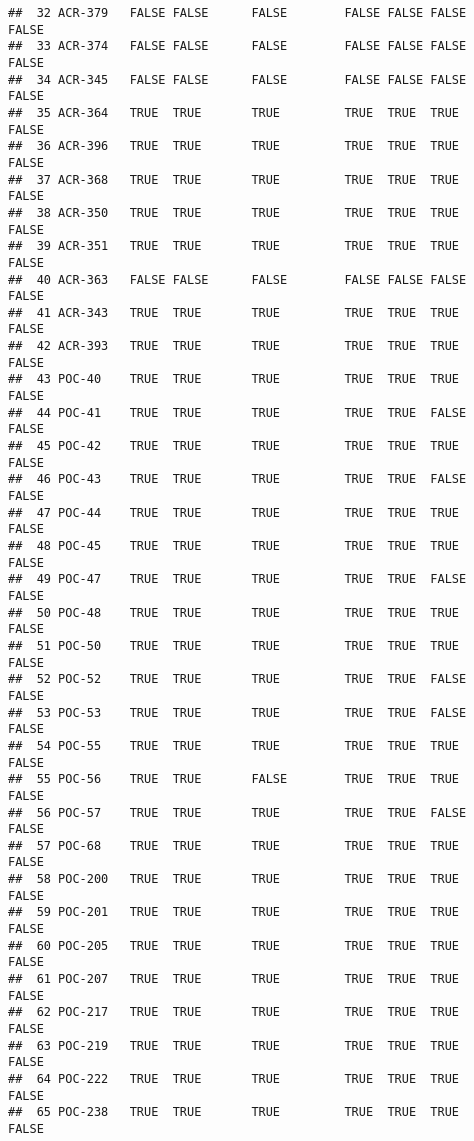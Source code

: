 \documentclass[]{article}
\begin{document}
\begin{verbatim}
##  32 ACR-379   FALSE FALSE      FALSE        FALSE FALSE FALSE   FALSE     
##  33 ACR-374   FALSE FALSE      FALSE        FALSE FALSE FALSE   FALSE     
##  34 ACR-345   FALSE FALSE      FALSE        FALSE FALSE FALSE   FALSE     
##  35 ACR-364   TRUE  TRUE       TRUE         TRUE  TRUE  TRUE    FALSE     
##  36 ACR-396   TRUE  TRUE       TRUE         TRUE  TRUE  TRUE    FALSE     
##  37 ACR-368   TRUE  TRUE       TRUE         TRUE  TRUE  TRUE    FALSE     
##  38 ACR-350   TRUE  TRUE       TRUE         TRUE  TRUE  TRUE    FALSE     
##  39 ACR-351   TRUE  TRUE       TRUE         TRUE  TRUE  TRUE    FALSE     
##  40 ACR-363   FALSE FALSE      FALSE        FALSE FALSE FALSE   FALSE     
##  41 ACR-343   TRUE  TRUE       TRUE         TRUE  TRUE  TRUE    FALSE     
##  42 ACR-393   TRUE  TRUE       TRUE         TRUE  TRUE  TRUE    FALSE     
##  43 POC-40    TRUE  TRUE       TRUE         TRUE  TRUE  TRUE    FALSE     
##  44 POC-41    TRUE  TRUE       TRUE         TRUE  TRUE  FALSE   FALSE     
##  45 POC-42    TRUE  TRUE       TRUE         TRUE  TRUE  TRUE    FALSE     
##  46 POC-43    TRUE  TRUE       TRUE         TRUE  TRUE  FALSE   FALSE     
##  47 POC-44    TRUE  TRUE       TRUE         TRUE  TRUE  TRUE    FALSE     
##  48 POC-45    TRUE  TRUE       TRUE         TRUE  TRUE  TRUE    FALSE     
##  49 POC-47    TRUE  TRUE       TRUE         TRUE  TRUE  FALSE   FALSE     
##  50 POC-48    TRUE  TRUE       TRUE         TRUE  TRUE  TRUE    FALSE     
##  51 POC-50    TRUE  TRUE       TRUE         TRUE  TRUE  TRUE    FALSE     
##  52 POC-52    TRUE  TRUE       TRUE         TRUE  TRUE  FALSE   FALSE     
##  53 POC-53    TRUE  TRUE       TRUE         TRUE  TRUE  FALSE   FALSE     
##  54 POC-55    TRUE  TRUE       TRUE         TRUE  TRUE  TRUE    FALSE     
##  55 POC-56    TRUE  TRUE       FALSE        TRUE  TRUE  TRUE    FALSE     
##  56 POC-57    TRUE  TRUE       TRUE         TRUE  TRUE  FALSE   FALSE     
##  57 POC-68    TRUE  TRUE       TRUE         TRUE  TRUE  TRUE    FALSE     
##  58 POC-200   TRUE  TRUE       TRUE         TRUE  TRUE  TRUE    FALSE     
##  59 POC-201   TRUE  TRUE       TRUE         TRUE  TRUE  TRUE    FALSE     
##  60 POC-205   TRUE  TRUE       TRUE         TRUE  TRUE  TRUE    FALSE     
##  61 POC-207   TRUE  TRUE       TRUE         TRUE  TRUE  TRUE    FALSE     
##  62 POC-217   TRUE  TRUE       TRUE         TRUE  TRUE  TRUE    FALSE     
##  63 POC-219   TRUE  TRUE       TRUE         TRUE  TRUE  TRUE    FALSE     
##  64 POC-222   TRUE  TRUE       TRUE         TRUE  TRUE  TRUE    FALSE     
##  65 POC-238   TRUE  TRUE       TRUE         TRUE  TRUE  TRUE    FALSE     

\end{verbatim}
\end{document}
